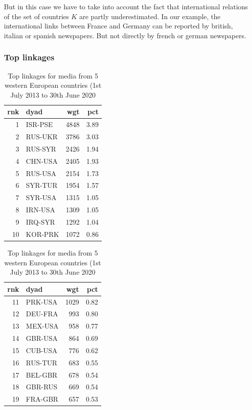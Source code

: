 \documentclass[
]{article}
\begin{document}
But in this case we have to take into account the fact that
international relations of the set of countries \(K\) are partly
underestimated. In our example, the international links between France
and Germany can be reported by british, italian or spanish newspapers.
But not directly by french or german newspapers.

\hypertarget{top-linkages}{%
\subsubsection{Top linkages}\label{top-linkages}}

\begin{table}
\caption{\label{tab:unnamed-chunk-3}Top linkages for media from 5 western European countries (1st July 2013 to 30th June 2020}

\begin{tabular}[t]{r|l|r|r}
\hline
rnk & dyad & wgt & pct\\
\hline
1 & ISR-PSE & 4848 & 3.89\\
\hline
2 & RUS-UKR & 3786 & 3.03\\
\hline
3 & RUS-SYR & 2426 & 1.94\\
\hline
4 & CHN-USA & 2405 & 1.93\\
\hline
5 & RUS-USA & 2154 & 1.73\\
\hline
6 & SYR-TUR & 1954 & 1.57\\
\hline
7 & SYR-USA & 1315 & 1.05\\
\hline
8 & IRN-USA & 1309 & 1.05\\
\hline
9 & IRQ-SYR & 1292 & 1.04\\
\hline
10 & KOR-PRK & 1072 & 0.86\\
\hline
\end{tabular}
\begin{tabular}[t]{r|l|r|r}
\hline
rnk & dyad & wgt & pct\\
\hline
11 & PRK-USA & 1029 & 0.82\\
\hline
12 & DEU-FRA & 993 & 0.80\\
\hline
13 & MEX-USA & 958 & 0.77\\
\hline
14 & GBR-USA & 864 & 0.69\\
\hline
15 & CUB-USA & 776 & 0.62\\
\hline
16 & RUS-TUR & 683 & 0.55\\
\hline
17 & BEL-GBR & 678 & 0.54\\
\hline
18 & GBR-RUS & 669 & 0.54\\
\hline
19 & FRA-GBR & 657 & 0.53\\

\end{tabular}
\end{table}
\end{document}
